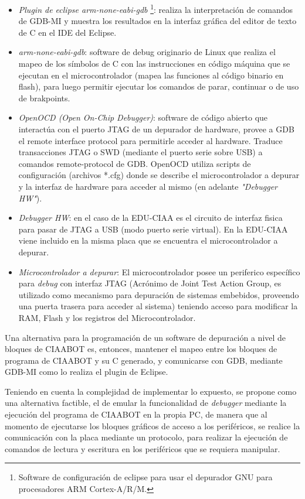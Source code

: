 \begin{itemize}
	\item \emph{Plugin de eclipse arm-none-eabi-gdb}
	\footnote{Software de configuración de eclipse para usar el depurador GNU para procesadores ARM Cortex-A/R/M.}: realiza la interpretación de comandos de	GDB-MI y muestra los resultados en la interfaz gráfica del editor de texto de C en el IDE del Eclipse.
	\item \emph{arm-none-eabi-gdb}: software de debug originario de Linux que realiza el mapeo de los símbolos de C con las instrucciones en código máquina que se ejecutan en el microcontrolador (mapea las funciones al código binario en flash), para
	luego permitir ejecutar los comandos de parar, continuar o de uso de brakpoints.
	\item \emph{OpenOCD (Open On-Chip Debugger)}: software de código abierto que interactúa con el puerto JTAG de un depurador de hardware, provee a GDB el remote interface protocol para permitirle acceder al hardware. Traduce transacciones JTAG o SWD (mediante el puerto serie sobre USB) a comandos remote-protocol de GDB. OpenOCD utiliza scripts de configuración (archivos *.cfg) donde se describe el microcontrolador a depurar y la interfaz de hardware para acceder al mismo (en adelante \emph{"Debugger HW"}).
	\item \emph{Debugger HW}: en el caso de la EDU-CIAA es el circuito de interfaz fisica para pasar de JTAG a USB (modo puerto serie virtual). En la EDU-CIAA
	viene incluido en la misma placa que se encuentra el microcontrolador a depurar.
	\item \emph{Microcontrolador a depurar}: El microcontrolador posee un periferico específico para \emph{debug} con interfaz JTAG (Acrónimo de Joint Test Action Group, es utilizado como mecanismo para depuración de sistemas embebidos, proveendo una puerta trasera para acceder al sistema) teniendo acceso para modificar la RAM, Flash y los registros del Microcontrolador.
\end{itemize}

Una alternativa para la programación de un software de depuración a nivel de bloques de CIAABOT es, entonces, mantener el mapeo entre los bloques de programa de CIAABOT y su C generado, y comunicarse con GDB, mediante GDB-MI como lo realiza el plugin de Eclipse.

Teniendo en cuenta la complejidad de implementar lo expuesto, se propone como una alternativa factible, el de emular la funcionalidad de \emph{debugger} mediante la ejecución del programa de CIAABOT en la propia PC, de manera que al momento de ejecutarse los bloques gráficos de acceso a los periféricos, se realice la comunicación con la placa mediante un protocolo, para realizar la ejecución de comandos de lectura y escritura en los periféricos que se requiera manipular.

